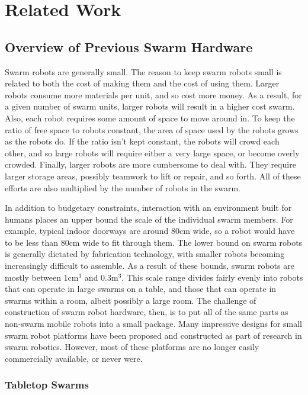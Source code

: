 \chapter{Related Work}

\section{Overview of Previous Swarm Hardware} \label{section:Overview_of_Previous_Swarm_Hardware}

Swarm robots are generally small. 
The reason to keep swarm robots small is related to both the cost of making them and the cost of using them. 
Larger robots consume more materials per unit, and so cost more money.
As a result, for a given number of swarm units, larger robots will result in a higher cost swarm. 
Also, each robot requires some amount of space to move around in. 
To keep the ratio of free space to robots constant, the area of space used by the robots grows as the robots do. 
If the ratio isn't kept constant, the robots will crowd each other, and so large robots will require either a very large space, or become overly crowded.
Finally, larger robots are more cumbersome to deal with. 
They require larger storage areas, possibly teamwork to lift or repair, and so forth. 
All of these efforts are also multiplied by the number of robots in the swarm. 
 
In addition to budgetary constraints, interaction with an environment built for humans places an upper bound the scale of the individual swarm members. 
For example, typical indoor doorways are around 80cm wide, so a robot would have to be less than 80cm wide to fit through them. 
The lower bound on swarm robots is generally dictated by fabrication technology, with smaller robots becoming increasingly difficult to assemble. 
As a result of these bounds, swarm robots are mostly between 1cm$^3$ and 0.3m$^3$. 
This scale range divides fairly evenly into robots that can operate in large swarms on a table, and those that can operate in swarms within a room, albeit possibly a large room. 
The challenge of construction of swarm robot hardware, then, is to put all of the same parts as non-swarm mobile robots into a small package.
Many impressive designs for small swarm robot platforms have been proposed and constructed as part of research in swarm robotics. 
However, most of these platforms are no longer easily commercially available, or never were. 

\subsection{Tabletop Swarms} \label{section:Tabletop_Swarms}

